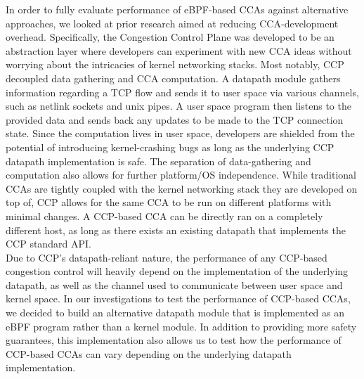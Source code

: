 \documentclass[../main.tex]{subfiles}
\begin{document}
In order to fully evaluate performance of eBPF-based CCAs against alternative approaches, we looked at prior research aimed at reducing CCA-development overhead. Specifically, the Congestion Control Plane was developed to be an abstraction layer where developers can experiment with new CCA ideas without worrying about the intricacies of kernel networking stacks. Most notably, CCP decoupled data gathering and CCA computation. A datapath module gathers information regarding a TCP flow and sends it to user space via various channels, such as netlink sockets and unix pipes. A user space program then listens to the provided data and sends back any updates to be made to the TCP connection state. Since the computation lives in user space, developers are shielded from the potential of introducing kernel-crashing bugs as long as the underlying CCP datapath implementation is safe. The separation of data-gathering and computation also allows for further platform/OS independence. While traditional CCAs are tightly coupled with the kernel networking stack they are developed on top of, CCP allows for the same CCA to be run on different platforms with minimal changes. A CCP-based CCA can be directly ran on a completely different host, as long as there exists an existing datapath that implements the CCP standard API. \\ 
Due to CCP's datapath-reliant nature, the performance of any CCP-based congestion control will heavily depend on the implementation of the underlying datapath, as well as the channel used to communicate between user space and kernel space. In our investigations to test the performance of CCP-based CCAs, we decided to build an alternative datapath module that is implemented as an eBPF program rather than a kernel module. In addition to providing more safety guarantees, this implementation also allows us to test how the performance of CCP-based CCAs can vary depending on the underlying datapath implementation. \\
\end{document}
